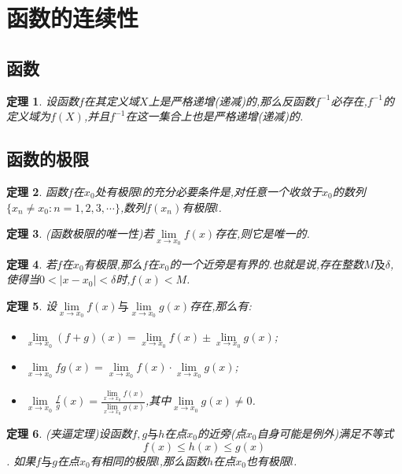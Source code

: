 \documentclass[UTF8]{ctexart}
\newtheorem{theorem}{定理}[section]
\begin{document}
\section{函数的连续性}

\subsection{函数}
\begin{theorem}
  设函数$f$在其定义域$X$上是严格递增(递减)的,那么反函数$f^{-1}$必存在,$f^{-1}$的定义域为$f(X)$,并且$f^{-1}$在这一集合上也是严格递增(递减)的.
\end{theorem}

\subsection{函数的极限}
\begin{theorem}
  函数$f$在$x_{0}$处有极限$l$的充分必要条件是,对任意一个收敛于$x_{0}$的数列$\{x_n \neq x_0:n=1,2,3,\cdots\}$,数列${f(x_n)}$有极限$l$.
\end{theorem}
\begin{theorem}
  (函数极限的唯一性)若$\lim\limits_{x \to x_{0} }f(x)$存在,则它是唯一的. 
\end{theorem}
\begin{theorem}
  若$f$在$x_0$有极限,那么$f$在$x_0$的一个近旁是有界的.也就是说,存在整数$M \mbox{及}\delta$,使得当$0<|x-x_0|<\delta$时,$f(x)<M$.
\end{theorem}
\begin{theorem}
  设$\lim\limits_{x \to x_0 }f(x)\mbox{与}\lim\limits_{x \to x_0 }g(x)$存在,那么有:
  
\begin{itemize}
\item $\lim\limits_{x \to x_0 }(f+g)(x)=\lim\limits_{x \to x_0 }f(x) \pm \lim\limits_{x \to x_0 }g(x)$;
\item $\lim\limits_{x \to x_0 }fg(x)=\lim\limits_{x \to x_0 }f(x) \cdot \lim\limits_{x \to x_0 }g(x)$;
\item $\lim\limits_{x \to x_0 }\frac{f}{g}(x)=\frac{\lim\limits_{x \to x_0 }f(x)}{\lim\limits_{x \to x_0 }g(x)}$,其中$\lim\limits_{x \to x_0 }g(x) \neq 0$.
\end{itemize}
\end{theorem}
\begin{theorem}
  (夹逼定理)设函数$f,g \mbox{与}h$在点$x_0$的近旁(点$x_0$自身可能是例外)满足不等式
  \[f(x) \leq h(x)\leq g(x)\].
  如果$f \mbox{与} g$在点$x_0$有相同的极限$l$,那么函数$h$在点$x_0$也有极限$l$.
\end{theorem}
\end{document}
